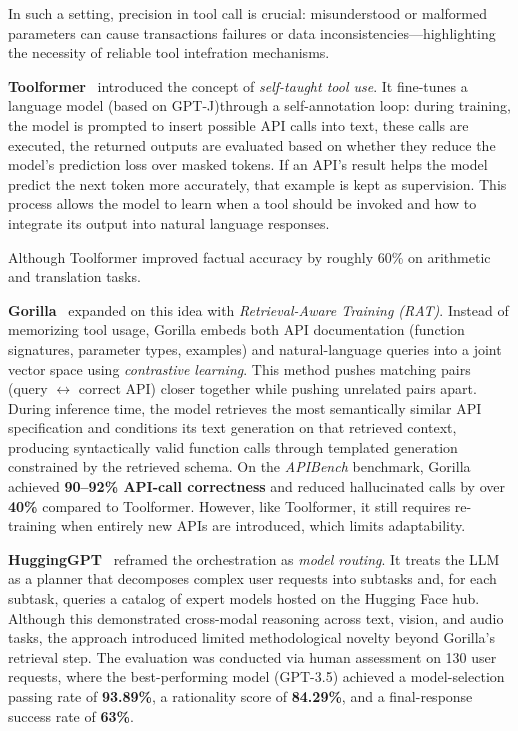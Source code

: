 In such a setting, precision in tool call is crucial: misunderstood or malformed parameters can cause transactions failures or data inconsistencies—highlighting the necessity of reliable tool intefration  mechanisms.

\textbf{Toolformer}~\cite{schick2023toolformer} introduced the concept of \emph{self-taught tool use}.  
It fine-tunes a language model (based on \gls{GPT}-J)through a self-annotation loop: during training, the model is prompted to insert possible API calls into text, these calls are executed, the returned outputs are evaluated based on whether they reduce the model's prediction loss over masked tokens.
If an API’s result helps the model predict the next token more accurately, that example is kept as supervision.  
This process allows the model to learn when a tool should be invoked and how to integrate its output into natural language responses.  

Although Toolformer improved factual accuracy by roughly 60\% on arithmetic and translation tasks.

\textbf{Gorilla}~\cite{patil2023gorilla} expanded on this idea with \emph{Retrieval-Aware Training (RAT)}.  
Instead of memorizing tool usage, Gorilla embeds both API documentation (function signatures, parameter types, examples) and natural-language queries into a joint vector space using \emph{contrastive learning}. This method pushes matching pairs (query $\leftrightarrow$ correct API) closer together while pushing unrelated pairs apart.  
During inference time, the model retrieves the most semantically similar API specification and conditions its text generation on that retrieved context, producing syntactically valid function calls through templated generation constrained by the retrieved schema.  
On the \textit{APIBench} benchmark, Gorilla achieved \textbf{90–92\% API-call correctness} and reduced hallucinated calls by over \textbf{40\%} compared to Toolformer.  
However, like Toolformer,  it still requires re-training when entirely new APIs are introduced, which limits adaptability.

\textbf{HuggingGPT}~\cite{shen2023hugginggpt} reframed the orchestration as \emph{model routing}.  
It treats the LLM as a planner that decomposes complex user requests into subtasks and, for each subtask, queries a catalog of expert models hosted on the Hugging Face hub.  
Although this demonstrated cross-modal reasoning across text, vision, and audio tasks, the approach introduced limited methodological novelty beyond Gorilla’s retrieval step.  
The evaluation was conducted via human assessment on 130 user requests, where the best-performing model (\gls{GPT}-3.5) achieved a model-selection passing rate of \textbf{93.89\%}, a rationality score of \textbf{84.29\%}, and a final-response success rate of \textbf{63\%}.



